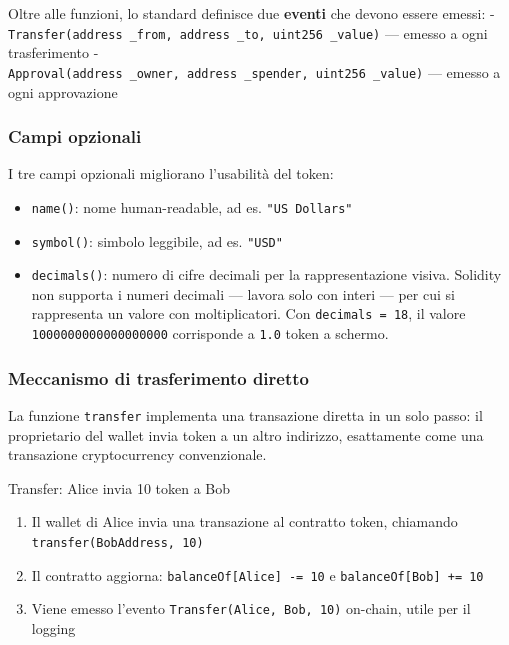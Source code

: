 \documentclass[
  italian,
  openany]{book}
\providecommand{\tightlist}{%
  \setlength{\itemsep}{0pt}\setlength{\parskip}{0pt}}
\begin{document}
Oltre alle funzioni, lo standard definisce due \textbf{eventi} che
devono essere emessi: -
\texttt{Transfer(address\ \_from,\ address\ \_to,\ uint256\ \_value)}
--- emesso a ogni trasferimento -
\texttt{Approval(address\ \_owner,\ address\ \_spender,\ uint256\ \_value)}
--- emesso a ogni approvazione

\subsubsection{Campi opzionali}\label{campi-opzionali}

I tre campi opzionali migliorano l'usabilità del token:

\begin{itemize}
\tightlist
\item
  \texttt{name()}: nome human-readable, ad es. \texttt{"US\ Dollars"}
\item
  \texttt{symbol()}: simbolo leggibile, ad es. \texttt{"USD"}
\item
  \texttt{decimals()}: numero di cifre decimali per la rappresentazione
  visiva. Solidity non supporta i numeri decimali --- lavora solo con
  interi --- per cui si rappresenta un valore con moltiplicatori. Con
  \texttt{decimals\ =\ 18}, il valore \texttt{1000000000000000000}
  corrisponde a \texttt{1.0} token a schermo.
\end{itemize}

\subsubsection{Meccanismo di trasferimento
diretto}\label{meccanismo-di-trasferimento-diretto}

La funzione \texttt{transfer} implementa una transazione diretta in un
solo passo: il proprietario del wallet invia token a un altro indirizzo,
esattamente come una transazione cryptocurrency convenzionale.

\begin{callouttip}{Transfer: Alice invia 10 token a Bob}

\begin{enumerate}
\def\labelenumi{\arabic{enumi}.}
\tightlist
\item
  Il wallet di Alice invia una transazione al contratto token, chiamando
  \texttt{transfer(BobAddress,\ 10)}
\item
  Il contratto aggiorna: \texttt{balanceOf{[}Alice{]}\ -=\ 10} e
  \texttt{balanceOf{[}Bob{]}\ +=\ 10}
\item
  Viene emesso l'evento \texttt{Transfer(Alice,\ Bob,\ 10)} on-chain,
  utile per il logging
\end{enumerate}

\end{callouttip}
\end{document}
